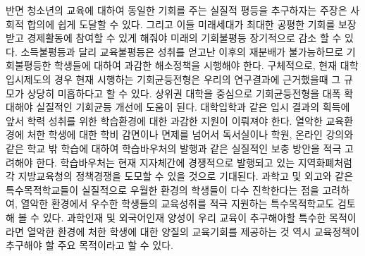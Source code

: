 반면 청소년의 교육에 대하여 동일한 기회를 주는 실질적 평등을 추구하자는 주장은 사회적 합의에 쉽게 도달할 수 있다.
그리고 이들 미래세대가 최대한 공평한 기회를 보장받고 경제활동에 참여할 수 있게 해줘야 미래의 기회불평등 장기적으로 감소 할 수 있다.
소득불평등과 달리 교육불평등은 성취를 얻고난 이후의 재분배가 불가능하므로 기회불평등한 학생들에 대하여 과감한 해소정책을 시행해야 한다.
구체적으로, 현재 대학입시제도의 경우 현재 시행하는 기회균등전형은 우리의 연구결과에 근거했을때 그 규모가 상당히 미흡하다고 할 수 있다.
상위권 대학을 중심으로 기회균등전형을 대폭 확대해야 실질적인 기회균등 개선에 도움이 된다.
대학입학과 같은 입시 결과의 획득에 앞서 학력 성취를 위한 학습환경에 대한 과감한 지원이 이뤄져야 한다. 
열악한 교육환경에 처한 학생에 대한 학비 감면이나 면제를 넘어서 독서실이나 학원, 온라인 강의와 같은 학교 밖 학습에 대하여 학습바우처의 발행과 같은 실질적인 보충 방안을 적극 고려해야 한다.
학습바우처는 현재 지자체간에 경쟁적으로 발행되고 있는 지역화폐처럼 각 지방교육청의 정책경쟁을 도모할 수 있을 것으로 기대된다.
과학고 및 외고와 같은 특수목적학교들이 실질적으로 우월한 환경의 학생들이 다수 진학한다는 점을 고려하여, 열악한 환경에서 우수한 학생들의 교육성취를 적극 지원하는 특수목적학교도 검토해 볼 수 있다.
과학인재 및 외국어인재 양성이 우리 교육이 추구해야할 특수한 목적이라면 열악한 환경에 처한 학생에 대한 양질의 교육기회를 제공하는 것 역시 교육정책이 추구해야 할 주요 목적이라고 할 수 있다.